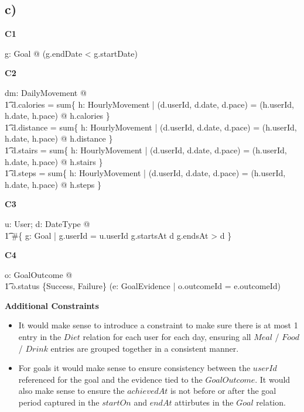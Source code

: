 \documentclass{article}
\begin{document}
\subsection*{\small c)}

\textbf{\small{C1}}
\begin{zed}
\forall g: Goal @ \lnot (g.endDate < g.startDate) \\
\end{zed}
\textbf{\small{C2}}
\begin{zed}
\forall dm: DailyMovement @ \\
    \t1 d.calories = sum\{ h: HourlyMovement | (d.userId, d.date, d.pace) = (h.userId, h.date, h.pace) @ h.calories \} \\
    \t1 d.distance = sum\{ h: HourlyMovement | (d.userId, d.date, d.pace) = (h.userId, h.date, h.pace) @ h.distance \} \\
    \t1 d.stairs = sum\{ h: HourlyMovement | (d.userId, d.date, d.pace) = (h.userId, h.date, h.pace) @ h.stairs \} \\
    \t1 d.steps = sum\{ h: HourlyMovement | (d.userId, d.date, d.pace) = (h.userId, h.date, h.pace) @ h.steps \} \\
\end{zed}
\textbf{\small{C3}}
\begin{zed}
\forall u: User; d: DateType @ \\
\t1 \#\{ g: Goal | g.userId = u.userId \land g.startsAt \leq d \land g.endsAt > d \} 
\end{zed}
\textbf{\small{C4}}
\begin{zed}
\forall o: GoalOutcome @ \\
\t1 o.status \in \{Success, Failure\} \implies (\exists e: GoalEvidence | o.outcomeId = e.outcomeId) \\
\end{zed}
\textbf{\small{Additional Constraints}}

\begin{itemize}
  \item It would make sense to introduce a constraint to make sure there is at most 1 entry in the $Diet$ relation for each user for each day, ensuring all $Meal$ / $Food$ / $Drink$ entries are grouped together in a consistent manner.
  \item For goals it would make sense to ensure consistency between the $userId$ referenced for the goal and the evidence tied to the $GoalOutcome$. It would also make sense to ensure the $achievedAt$ is not before or after the goal period captured in the $startOn$ and $endAt$ attirbutes in the $Goal$ relation.
\end{itemize}
\end{document}
